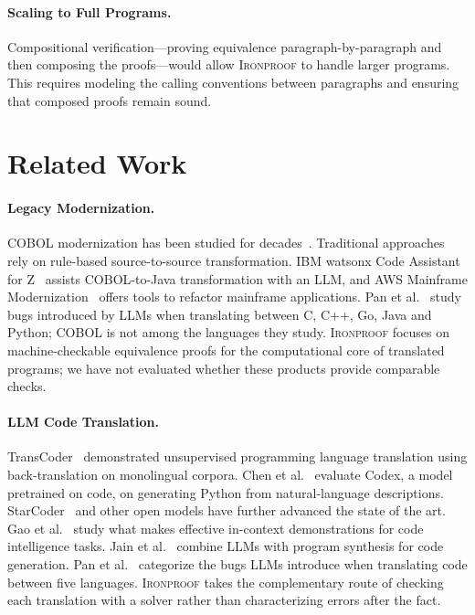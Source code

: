 \documentclass[sigconf,nonacm]{acmart}
\begin{document}
\paragraph{Scaling to Full Programs.} Compositional verification---proving equivalence paragraph-by-paragraph and then composing the proofs---would allow \textsc{Ironproof} to handle larger programs. This requires modeling the calling conventions between paragraphs and ensuring that composed proofs remain sound.


\section{Related Work}\label{sec:related}

\paragraph{Legacy Modernization.} COBOL modernization has been studied for decades~\cite{sneed2010automated}. Traditional approaches rely on rule-based source-to-source transformation. IBM watsonx Code Assistant for Z~\cite{ibm2024watsonx} assists COBOL-to-Java transformation with an LLM, and AWS Mainframe Modernization~\cite{aws2023mainframe} offers tools to refactor mainframe applications. Pan et al.~\cite{pan2024cobol} study bugs introduced by LLMs when translating between C, C++, Go, Java and Python; COBOL is not among the languages they study. \textsc{Ironproof} focuses on machine-checkable equivalence proofs for the computational core of translated programs; we have not evaluated whether these products provide comparable checks.

\paragraph{LLM Code Translation.} TransCoder~\cite{roziere2020transcoder} demonstrated unsupervised programming language translation using back-translation on monolingual corpora. Chen et al.~\cite{chen2021evaluating} evaluate Codex, a model pretrained on code, on generating Python from natural-language descriptions. StarCoder~\cite{li2023starcoder} and other open models have further advanced the state of the art. Gao et al.~\cite{gao2023incontext} study what makes effective in-context demonstrations for code intelligence tasks. Jain et al.~\cite{jain2022jigsaw} combine LLMs with program synthesis for code generation. Pan et al.~\cite{pan2024cobol} categorize the bugs LLMs introduce when translating code between five languages. \textsc{Ironproof} takes the complementary route of checking each translation with a solver rather than characterizing errors after the fact.
\end{document}
